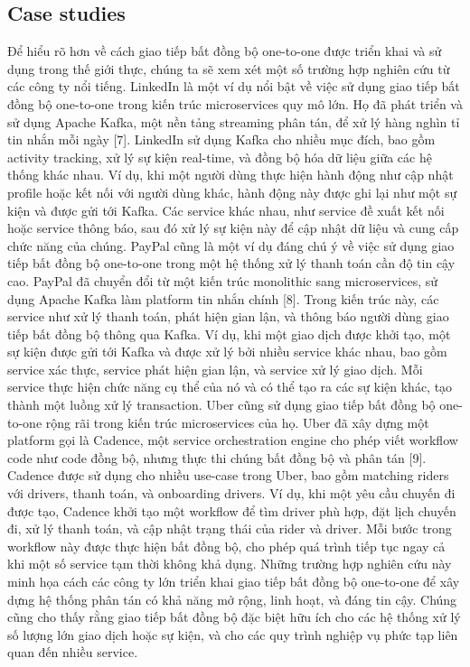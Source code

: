 \subsection{Case studies}
Để hiểu rõ hơn về cách giao tiếp bất đồng bộ one-to-one được triển khai và sử dụng trong thế giới thực, chúng ta sẽ xem xét một số trường hợp nghiên cứu từ các công ty nổi tiếng.
LinkedIn là một ví dụ nổi bật về việc sử dụng giao tiếp bất đồng bộ one-to-one trong kiến trúc microservices quy mô lớn. Họ đã phát triển và sử dụng Apache Kafka, một nền tảng streaming phân tán, để xử lý hàng nghìn tỉ tin nhắn mỗi ngày [7]. LinkedIn sử dụng Kafka cho nhiều mục đích, bao gồm activity tracking, xử lý sự kiện real-time, và đồng bộ hóa dữ liệu giữa các hệ thống khác nhau. Ví dụ, khi một người dùng thực hiện hành động như cập nhật profile hoặc kết nối với người dùng khác, hành động này được ghi lại như một sự kiện và được gửi tới Kafka. Các service khác nhau, như service đề xuất kết nối hoặc service thông báo, sau đó xử lý sự kiện này để cập nhật dữ liệu và cung cấp chức năng của chúng.
PayPal cũng là một ví dụ đáng chú ý về việc sử dụng giao tiếp bất đồng bộ one-to-one trong một hệ thống xử lý thanh toán cần độ tin cậy cao. PayPal đã chuyển đổi từ một kiến trúc monolithic sang microservices, sử dụng Apache Kafka làm platform tin nhắn chính [8]. Trong kiến trúc này, các service như xử lý thanh toán, phát hiện gian lận, và thông báo người dùng giao tiếp bất đồng bộ thông qua Kafka. Ví dụ, khi một giao dịch được khởi tạo, một sự kiện được gửi tới Kafka và được xử lý bởi nhiều service khác nhau, bao gồm service xác thực, service phát hiện gian lận, và service xử lý giao dịch. Mỗi service thực hiện chức năng cụ thể của nó và có thể tạo ra các sự kiện khác, tạo thành một luồng xử lý transaction.
Uber cũng sử dụng giao tiếp bất đồng bộ one-to-one rộng rãi trong kiến trúc microservices của họ. Uber đã xây dựng một platform gọi là Cadence, một service orchestration engine cho phép viết workflow code như code đồng bộ, nhưng thực thi chúng bất đồng bộ và phân tán [9]. Cadence được sử dụng cho nhiều use-case trong Uber, bao gồm matching riders với drivers, thanh toán, và onboarding drivers. Ví dụ, khi một yêu cầu chuyến đi được tạo, Cadence khởi tạo một workflow để tìm driver phù hợp, đặt lịch chuyến đi, xử lý thanh toán, và cập nhật trạng thái của rider và driver. Mỗi bước trong workflow này được thực hiện bất đồng bộ, cho phép quá trình tiếp tục ngay cả khi một số service tạm thời không khả dụng.
Những trường hợp nghiên cứu này minh họa cách các công ty lớn triển khai giao tiếp bất đồng bộ one-to-one để xây dựng hệ thống phân tán có khả năng mở rộng, linh hoạt, và đáng tin cậy. Chúng cũng cho thấy rằng giao tiếp bất đồng bộ đặc biệt hữu ích cho các hệ thống xử lý số lượng lớn giao dịch hoặc sự kiện, và cho các quy trình nghiệp vụ phức tạp liên quan đến nhiều service.

